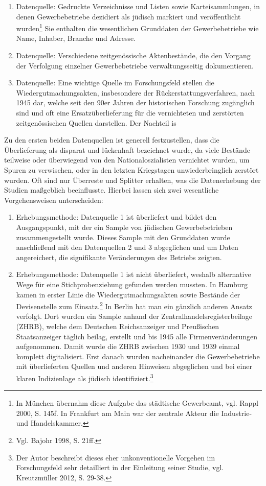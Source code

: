 \begin{enumerate}
    \item Datenquelle: Gedruckte Verzeichnisse und Listen sowie Karteisammlungen, in denen Gewerbebetriebe dezidiert als jüdisch markiert und veröffentlicht wurden\footnote{In München übernahm diese Aufgabe das städtische Gewerbeamt, vgl. Rappl 2000, S. 145f. In Frankfurt am Main war der zentrale Akteur die Industrie- und Handelskammer.} Sie enthalten die wesentlichen Grunddaten der Gewerbebetriebe wie Name, Inhaber, Branche und Adresse.
    \item Datenquelle: Verschiedene zeitgenössische Aktenbestände, die den Vorgang der Verfolgung einzelner Gewerbebetriebe verwaltungsseitig dokumentieren. 
    \item Datenquelle: Eine wichtige Quelle im Forschungsfeld stellen die Wiedergutmachungsakten, insbesondere der Rückerstattungsverfahren, nach 1945 dar, welche seit den 90er Jahren der historischen Forschung zugänglich sind und oft eine Ersatzüberlieferung für die vernichteten und zerstörten zeitgenössischen Quellen darstellen. Der Nachteil is     
\end{enumerate}

Zu den ersten beiden Datenquellen ist generell festzustellen, dass die Überlieferung als disparat und lückenhaft bezeichnet wurde, da viele Bestände teilweise oder überwiegend von den Nationaloszialisten vernichtet wurden, um Spuren zu verwischen, oder in den letzten Kriegstagen unwiederbringlich zerstört wurden. Oft sind nur Überreste und Splitter erhalten, was die Datenerhebung der Studien maßgeblich beeinflusste. Hierbei lassen sich zwei wesentliche Vorgehensweisen unterscheiden:

\begin{enumerate}
    \item Erhebungsmethode: Datenquelle 1 ist überliefert und bildet den Ausgangspunkt, mit der ein Sample von jüdischen Gewerbebetrieben zusammengestellt wurde. Dieses Sample mit den Grunddaten wurde anschließend mit den Datenquellen 2 und 3 abgeglichen und um Daten angereichert, die signifikante Veränderungen des Betriebs zeigten.  
    \item Erhebungsmethode: Datenquelle 1 ist nicht überliefert, weshalb alternative Wege für eine Stichprobenziehung gefunden werden mussten. In Hamburg kamen in erster Linie die Wiedergutmachungsakten sowie Bestände der Devisenstelle zum Einsatz.\footnote{Vgl. Bajohr 1998, S. 21ff.} In Berlin hat man ein gänzlich anderen Ansatz verfolgt. Dort wurden ein Sample anhand der Zentralhandelsregisterbeilage (ZHRB), welche dem Deutschen Reichsanzeiger und Preußischen Staatsanzeiger täglich beilag, erstellt und bis 1945 alle Firmenveränderungen aufgenommen. Damit wurde die ZHRB zwischen 1930 und 1939 einmal komplett digitalisiert. Erst danach wurden nacheinander die Gewerbebetriebe mit überlieferten Quellen und anderen Hinweisen abgeglichen und bei einer klaren Indizienlage als jüdisch identifiziert.\footnote{Der Autor beschreibt dieses eher unkonventionelle Vorgehen im Forschungsfeld sehr detailliert in der Einleitung seiner Studie, vgl. Kreutzmüller 2012, S. 29-38.}
\end{enumerate}

